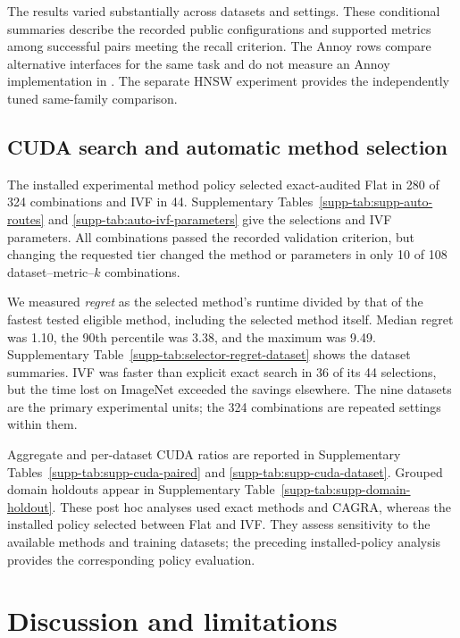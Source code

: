 \documentclass[article]{jss}
\begin{document}
The results varied substantially across datasets and settings. These
conditional summaries describe the recorded public configurations and
supported metrics among successful pairs meeting the recall criterion. The
Annoy rows compare alternative interfaces for the same task and do not
measure an Annoy implementation in . The separate HNSW experiment
provides the independently tuned same-family comparison.

\subsection{CUDA search and automatic method selection}

The installed experimental method policy selected exact-audited Flat in 280 of
324 combinations and IVF in 44. Supplementary
Tables~\ref{supp-tab:supp-auto-routes} and \ref{supp-tab:auto-ivf-parameters}
give the selections and IVF parameters. All combinations passed the recorded
validation criterion, but changing the requested tier changed the method
or parameters in only 10 of 108 dataset--metric--$k$ combinations.

We measured \emph{regret} as the selected method's runtime divided by that of
the fastest tested eligible method, including the selected method itself.
Median regret was 1.10, the 90th percentile was 3.38, and the maximum was
9.49. Supplementary Table~\ref{supp-tab:selector-regret-dataset} shows the
dataset summaries. IVF was faster than explicit exact search in 36 of its
44 selections, but the time lost on ImageNet exceeded the savings elsewhere.
The nine datasets are the primary experimental units; the 324 combinations
are repeated settings within them.

Aggregate and per-dataset CUDA ratios are reported in Supplementary
Tables~\ref{supp-tab:supp-cuda-paired} and \ref{supp-tab:supp-cuda-dataset}.
Grouped domain holdouts appear in
Supplementary Table~\ref{supp-tab:supp-domain-holdout}. These post hoc analyses
used exact methods and CAGRA, whereas the installed policy selected between
Flat and IVF. They assess sensitivity to the available methods and training
datasets; the preceding installed-policy analysis provides the corresponding
policy evaluation.

\section{Discussion and limitations} \label{sec:limitations}
\label{sec:conclusion}
\end{document}
